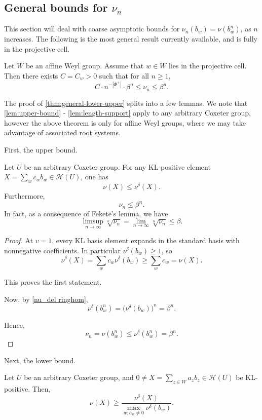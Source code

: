 \documentclass[a4paper,11pt]{amsart}
\newcommand{\Hecke}{\mc H}
\newcommand{\mc}{\mathcal}
\numberwithin{equation}{subsection}
\theoremstyle{definition}
\theoremstyle{remark}
\begin{document}
\subsection{General bounds for \texorpdfstring{$\nu_{n}$}{nun}}\label{sec:generalasymptotics}

This section will deal with coarse asymptotic bounds for
$\nu_n(b_w)=\nu(b_w^n)$, as $n$ increases. The following is the most general
result currently available, and is fully in the projective cell.

\begin{Theorem}\label{thm:general-lower-upper}
Let $W$ be an affine Weyl group. Assume that $w \in W$ lies in the projective cell. Then there exists $C=C_w>0$
such that for all $n\geq 1$,
\[
C\cdot n^{-|\Phi^+|}\cdot \beta^n\leq \nu_n\leq\beta^n.
\]
\end{Theorem}

The proof of \autoref{thm:general-lower-upper} splits into a few lemmas. We note that \autoref{lem:upper-bound} - \autoref{lem:length-support} apply to any arbitrary Coxeter group, however the above theorem is only for affine Weyl groups, where we may take advantage of associated root systems.

First, the upper bound.

\begin{Lemma}\label{lem:upper-bound}
Let $U$ be an arbitrary Coxeter group. For any KL-positive element $X=\sum_w c_wb_w \in \Hecke(U)$, one has
\[
\nu(X)\leq \nu^\delta(X).
\]
Furthermore, 
\[
\nu_n\leq\beta^n.
\]
In fact, as a consequence of Fekete's lemma, we have 
\[
\limsup_{n\to\infty}\sqrt[n]{\nu_n} = \lim_{n\to\infty}\sqrt[n]{\nu_n}\leq\beta.
\]
\end{Lemma}

\begin{proof}
At $v=1$, every KL basis element expands in the standard basis with
nonnegative coefficients. In particular $\nu^\delta(b_w)\ge 1$, so
\[
\nu^\delta(X)
=
\sum_w c_w\nu^\delta(b_w)
\geq
\sum_w c_w
=
\nu(X).
\]

This proves the first statement. 

Now, by \autoref{nu_del ringhom},
\[
\nu^\delta(b_w^n)
=
\bigl(\nu^\delta(b_w)\bigr)^n
=
\beta^n.
\]

Hence, \[\nu_n = \nu(b_w^n) \leq \nu^\delta(b_w^n) = \beta^n.\]
\end{proof}

Next, the lower bound.

\begin{Lemma}\label{lem:lower-by-standard-sum}
Let $U$ be an arbitrary Coxeter group, and $0\neq X=\sum_{z\in W}a_zb_z \in \Hecke(U)$ be KL-positive. Then,
\[
\nu(X)\geq
\frac{\nu^\delta(X)}
{\max_{w:a_w\neq 0}\nu^\delta(b_w)}.
\]
\end{Lemma}
\end{document}
